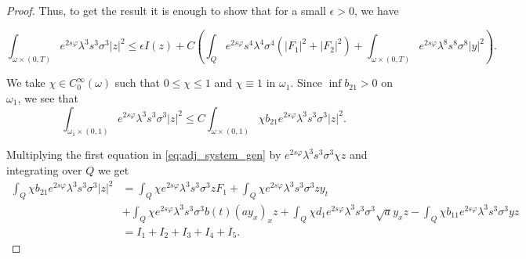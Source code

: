 \documentclass[11pt,oneside,a4papper]{osajnl}
\begin{document}
\begin{proof}
Thus, to get the result it is enough to show that for a small $\epsilon>0$, we have

$$
\int_{\omega \times (0,T)} e^{2s \varphi} \lambda^3 s^3 \sigma^3 |z|^2 \leq \epsilon I(z) + C \left( \int_Q e^{2s \varphi} s^4 \lambda^4 \sigma^4 (|F_1|^2 + |F_2|^2) + \int_{\omega \times (0,T)} e^{2s \varphi} \lambda^8 s^8 \sigma^8 |y|^2 \right).
$$

We take $\chi \in C_0^\infty(\omega)$ such that $0\leq \chi \leq 1$ and $\chi \equiv 1$ in $\omega_1$. Since $\inf b_{21} >0$ on $\omega_1$, we see that
$$
\int_{\omega_1 \times (0,1)} e^{2s\varphi} \lambda^3 s^3 \sigma^3 |z|^2 \leq C \int_{\omega \times (0,1)} \chi b_{21} e^{2s\varphi} \lambda^3 s^3 \sigma^3 |z|^2.
$$

Multiplying the first equation in \eqref{eq:adj_system_gen} by $e^{2s\varphi}\lambda^3 s^3 \sigma^3 \chi z$ and integrating over $Q$ we get
\begin{align*}
    \int_Q \chi b_{21} e^{2s\varphi} \lambda^3 s^3 \sigma^3 |z|^2 &= \int_Q \chi e^{2s\varphi} \lambda^3 s^3 \sigma^3 z F_1 + \int_Q \chi e^{2s\varphi} \lambda^3 s^3 \sigma^3 z y_t \\
    & +\int_Q \chi e^{2s\varphi} \lambda^3 s^3 \sigma^3 b(t) (a y_x)_x z + \int_Q \chi d_1 e^{2s\varphi} \lambda^3 s^3 \sigma^3 \sqrt{a} y_x z - \int_Q \chi b_{11} e^{2s\varphi} \lambda^3 s^3 \sigma^3 y z \\
    &= I_1 + I_2 + I_3 + I_4 + I_5.
\end{align*}


\end{proof}
\end{document}

